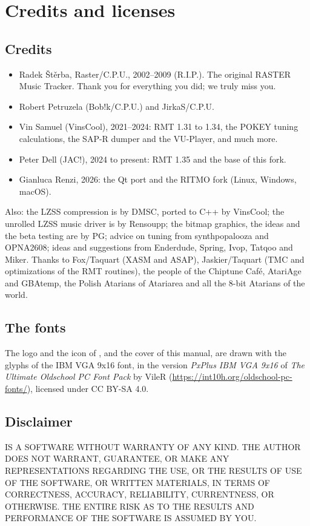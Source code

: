 \chapter{Credits and licenses}\label{app:credits}

\section{Credits}

\begin{itemize}
  \item Radek \v{S}t\v{e}rba, Raster/C.P.U., 2002--2009 (R.I.P.). The original RASTER Music Tracker. Thank you for everything you did; we truly miss you.
  \item Robert Petruzela (Bob!k/C.P.U.) and JirkaS/C.P.U.
  \item Vin Samuel (VinsCool), 2021--2024: RMT 1.31 to 1.34, the POKEY tuning calculations, the SAP-R dumper and the VU-Player, and much more.
  \item Peter Dell (JAC!), 2024 to present: RMT 1.35 and the base of this fork.
  \item Gianluca Renzi, 2026: the Qt port and the RITMO fork (Linux, Windows, macOS).
\end{itemize}

Also: the LZSS compression is by DMSC, ported to C++ by VinsCool; the unrolled LZSS music driver is by Rensoupp; the bitmap graphics, the ideas and the
beta testing are by PG; advice on tuning from synthpopalooza and OPNA2608; ideas and suggestions from Enderdude, Spring, Ivop, Tatqoo and Miker.
Thanks to Fox/Taquart (XASM and ASAP), Jaskier/Taquart (TMC and optimizations of the RMT routines), the people of the Chiptune Caf\'e, AtariAge and
GBAtemp, the Polish Atarians of Atariarea and all the 8-bit Atarians of the world.

\section{The fonts}

The logo and the icon of \RITMO{}, and the cover of this manual, are drawn with the glyphs of the IBM VGA 9x16 font, in the version \emph{PxPlus IBM VGA 9x16} of
\emph{The Ultimate Oldschool PC Font Pack} by VileR (\url{https://int10h.org/oldschool-pc-fonts/}), licensed under CC BY-SA 4.0.

\section{Disclaimer}

\RMT{} IS A SOFTWARE WITHOUT WARRANTY OF ANY KIND. THE AUTHOR DOES NOT WARRANT, GUARANTEE, OR MAKE ANY REPRESENTATIONS REGARDING THE USE, OR THE RESULTS OF
USE OF THE SOFTWARE, OR WRITTEN MATERIALS, IN TERMS OF CORRECTNESS, ACCURACY, RELIABILITY, CURRENTNESS, OR OTHERWISE. THE ENTIRE RISK AS TO THE RESULTS
AND PERFORMANCE OF THE SOFTWARE IS ASSUMED BY YOU.
